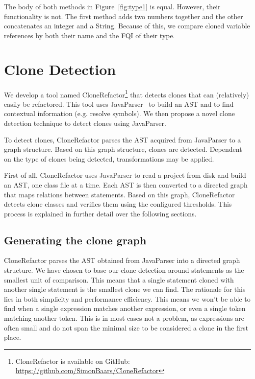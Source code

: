 \documentclass[conference]{IEEEtran}
\begin{document}
The body of both methods in Figure~\ref{fig:type1} is equal. However, their functionality is not. The first method adds two numbers together and the other concatenates an integer and a String. Because of this, we compare cloned variable references by both their name and the FQI of their type.

\section{Clone Detection}\label{sec:clonedetection}
We develop a tool named CloneRefactor\footnote{CloneRefactor is available on GitHub: \url{https://github.com/SimonBaars/CloneRefactor}} that detects clones that can (relatively) easily be refactored. This tool uses JavaParser~\cite{tomassetti2017javaparser} to build an AST and to find contextual information (e.g. resolve symbols). We then propose a novel clone detection technique to detect clones using JavaParser.

To detect clones, CloneRefactor parses the AST acquired from JavaParser to a graph structure. Based on this graph structure, clones are detected. Dependent on the type of clones being detected, transformations may be applied.

First of all, CloneRefactor uses JavaParser to read a project from disk and build an AST, one class file at a time. Each AST is then converted to a directed graph that maps relations between statements. Based on this graph, CloneRefactor detects clone classes and verifies them using the configured thresholds. This process is explained in further detail over the following sections.


\subsection{Generating the clone graph}\label{sec:clonegraph}
CloneRefactor parses the AST obtained from JavaParser into a directed graph structure. We have chosen to base our clone detection around statements as the smallest unit of comparison. This means that a single statement cloned with another single statement is the smallest clone we can find. The rationale for this lies in both simplicity and performance efficiency. This means we won't be able to find when a single expression matches another expression, or even a single token matching another token. This is in most cases not a problem, as expressions are often small and do not span the minimal size to be considered a clone in the first place.
\end{document}
